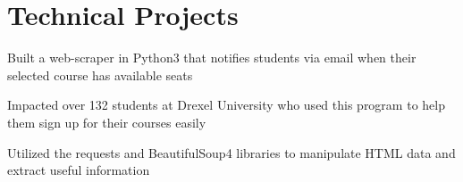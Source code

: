 \documentclass[]{deedy-resume-openfont}
\begin{document}
\begin{minipage}[t]{0.66\textwidth}



    \section{Technical Projects}
    \begin{tightemize}
        \item Built a web-scraper in Python3 that notifies students via email when their selected course has available seats
        \item Impacted over 132 students at Drexel University who used this program to help them sign up for their courses easily
        \item Utilized the requests and BeautifulSoup4 libraries to manipulate HTML data and extract useful information
    \end{tightemize}
    \sectionsep


\end{minipage}
\end{document}
